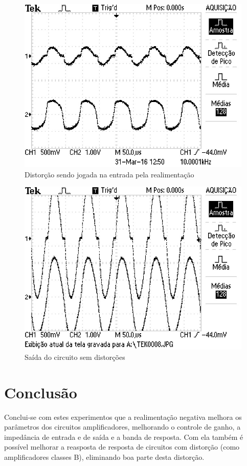 \documentclass[openright]{normas-utf-tex} %
\begin{document}
\begin{figure}[H]
\centering
\includegraphics[width=0.8\linewidth]{img/Circ2_Distorcao2.JPG}
\caption{Distorção sendo jogada na entrada pela realimentação }
\label{fig:resp_freq_com_real_fase}
\end{figure}

\begin{figure}[H]
\centering
\includegraphics[width=0.8\linewidth]{img/Circ2_distorcao3.JPG}
\caption{Saída do circuito sem distorções}
\label{fig:resp_freq_com_real_fase}
\end{figure}

\chapter{Conclus\~ao}

Conclui-se com estes experimentos que a realimentação negativa melhora os parâmetros dos circuitos amplificadores, melhorando o controle de ganho, a impedância de entrada e de saída e a banda de resposta. Com ela também é possível melhorar a reasposta de resposta de circuitos com distorção (como amplificadores classes B), eliminando boa parte desta distorção. 
\end{document}
